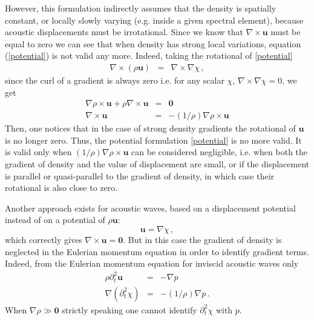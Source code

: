 However, this formulation indirectly assumes that the density is spatially constant, or locally slowly varying (e.g. inside a given spectral element),
because acoustic displacements must be irrotational. Since we know that $\nabla \times \mathbf{u}$ must be equal to zero
we can see that when density has strong local variations, equation (\ref{potential}) is not valid any more.
Indeed, taking the rotational of \eqref{potential}
\begin{eqnarray*}
\nabla \times (\rho \mathbf{u}) &=& \nabla\times\nabla \chi \, ,
\end{eqnarray*}
since the curl of a gradient is always zero i.e. for any scalar $\chi$, $ \nabla\times\nabla \chi = 0$, we get
\begin{eqnarray*}
\nabla\rho\times\mathbf{u} + \rho\nabla\times\mathbf{u} &=& \mathbf{0}\\
\nabla\times\mathbf{u}&=&-(1/\rho)\nabla\rho\times\mathbf{u}
\end{eqnarray*}
Then, one notices that in the case of strong density gradients the rotational of $\mathbf{u}$ is no longer zero.
Thus, the potential formulation \eqref{potential} is no more valid. It is valid only when $(1/\rho)\nabla\rho\times\mathbf{u}$ can be considered negligible,
i.e. when both the gradient of density and the value of displacement are small, or if the displacement is parallel or quasi-parallel to the gradient of density,
in which case their rotational is also close to zero.
\newline

Another approach exists for acoustic waves, based on a displacement potential instead of on a potential of $\rho \mathbf{u}$:
\begin{equation}
\mathbf{u} = \nabla \chi \, ,
\end{equation}
which correctly gives $\nabla\times\mathbf{u} = \mathbf{0}$.
But in this case the gradient of density is neglected in the Eulerian momentum equation in order to identify gradient terms.
Indeed, from the Eulerian momentum equation for inviscid acoustic waves only
\begin{eqnarray*}
\rho\partial_t^2\mathbf{u} &=& -\nabla p\\
\nabla (\partial_t^2\chi)&=& -(1/\rho)\nabla p \, .
\end{eqnarray*}
When $\nabla\rho \gg \mathbf{0}$ strictly speaking one cannot identify $\partial_t^2\chi$ with $p$.
\newline

